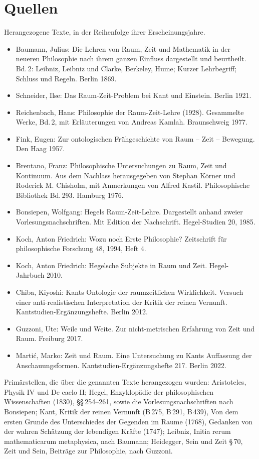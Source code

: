 \chapter{Quellen}

\sloppy Herangezogene Texte, in der Reihenfolge ihrer Erscheinungsjahre.

\begin{itemize}
\item Baumann, Julius: Die Lehren von Raum, Zeit und Mathematik in der neueren Philosophie nach ihrem ganzen Einfluss dargestellt und beurtheilt. Bd.\,2: Leibniz, Leibniz und Clarke, Berkeley, Hume; Kurzer Lehrbegriff; Schluss und Regeln. Berlin 1869.
\item Schneider, Ilse: Das Raum-Zeit-Problem bei Kant und Einstein. Berlin 1921.
\item Reichenbach, Hans: Philosophie der Raum-Zeit-Lehre (1928). Gesammelte Werke, Bd.\,2, mit Erläuterungen von Andreas Kamlah. Braunschweig 1977.
\item Fink, Eugen: Zur ontologischen Frühgeschichte von Raum -- Zeit -- Bewegung. Den Haag 1957.
\item Brentano, Franz: Philosophische Untersuchungen zu Raum, Zeit und Kontinuum. Aus dem Nachlass herausgegeben von Stephan Körner und Roderick M. Chisholm, mit Anmerkungen von Alfred Kastil. Philosophische Bibliothek Bd.\,293. Hamburg 1976.
\item Bonsiepen, Wolfgang: Hegels Raum-Zeit-Lehre. Dargestellt anhand zweier Vorlesungsnachschriften. Mit Edition der Nachschrift. Hegel-Studien 20, 1985.
\item Koch, Anton Friedrich: Wozu noch Erste Philosophie? Zeitschrift für philosophische Forschung 48, 1994, Heft 4.
\item Koch, Anton Friedrich: Hegelsche Subjekte in Raum und Zeit. Hegel-Jahrbuch 2010.
\item Chiba, Kiyoshi: Kants Ontologie der raumzeitlichen Wirklichkeit. Versuch einer anti-realistischen Interpretation der Kritik der reinen Vernunft. Kantstudien-Ergänzungshefte. Berlin 2012.
\item Guzzoni, Ute: Weile und Weite. Zur nicht-metrischen Erfahrung von Zeit und Raum. Freiburg 2017.
\item Martić, Marko: Zeit und Raum. Eine Untersuchung zu Kants Auffassung der Anschauungsformen. Kantstudien-Ergänzungshefte 217. Berlin 2022.
\end{itemize}

Primärstellen, die über die genannten Texte herangezogen wurden: Aristoteles, Physik IV und De caelo II; Hegel, Enzyklopädie der philosophischen Wissenschaften (1830), \S\S\,254--261, sowie die Vorlesungsnachschriften nach Bonsiepen; Kant, Kritik der reinen Vernunft (B\,275, B\,291, B\,439), Von dem ersten Grunde des Unterschiedes der Gegenden im Raume (1768), Gedanken von der wahren Schätzung der lebendigen Kräfte (1747); Leibniz, Initia rerum mathematicarum metaphysica, nach Baumann; Heidegger, Sein und Zeit \S\,70, Zeit und Sein, Beiträge zur Philosophie, nach Guzzoni.
